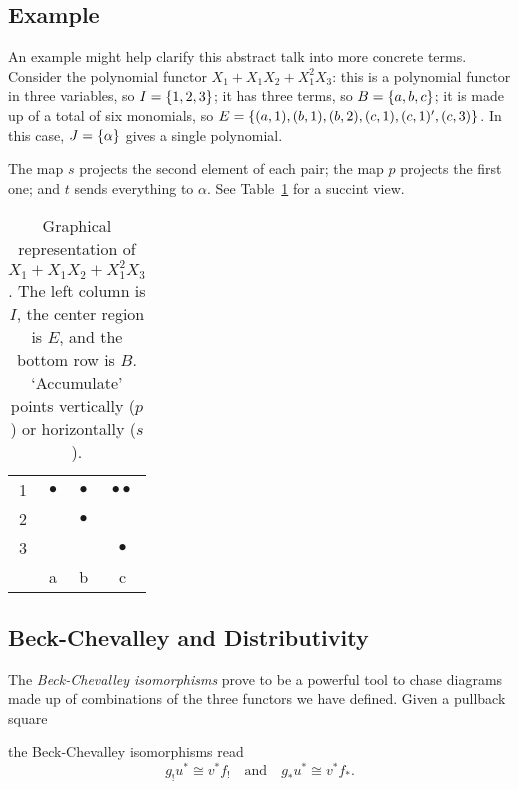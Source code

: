 \subsection{Example}

An example might help clarify this abstract talk into more concrete terms. Consider the polynomial functor $X_1+X_1X_2 + X_1^2X_3$: this is a polynomial functor in three variables, so $I=\{1,2,3\}$; it has three terms, so $B=\{a,b,c\}$; it is made up of a total of six monomials, so $E=\{(a,1), (b,1), (b,2), (c,1), (c,1)', (c,3)\}$. In this case, $J=\{\alpha\}$ gives a single polynomial.

The map $s$ projects the second element of each pair; the map $p$ projects the first one; and $t$ sends everything to $\alpha$. See Table~\ref{table:polyrep} for a succint view.
\begin{table}[]
\centering
\caption{Graphical representation of $X_1+X_1X_2+X_1^2X_3$. The left column is $I$, the center region is $E$, and the bottom row is $B$. `Accumulate' points vertically ($p$) or horizontally ($s$).}
\begin{tabular}{c|ccc}\label{table:polyrep}
1 & $\bullet$ & $\bullet$ & $\bullet\bullet$\\
2 &   & $\bullet$ &   \\
3 &   &   & $\bullet$ \\ \hline
  & a  & b  & c
\end{tabular}
\end{table}



\subsection{Beck-Chevalley and Distributivity}
The \emph{Beck-Chevalley isomorphisms} prove to be a powerful tool to chase diagrams made up of combinations of the three functors we have defined. Given a pullback square
\begin{center}
\end{center}
the Beck-Chevalley isomorphisms read
\begin{equation*}
  g_!u^* \cong v^*f_! \quad \text{and} \quad g_*u^* \cong v^*f_*.
\end{equation*}

\pagebreak
